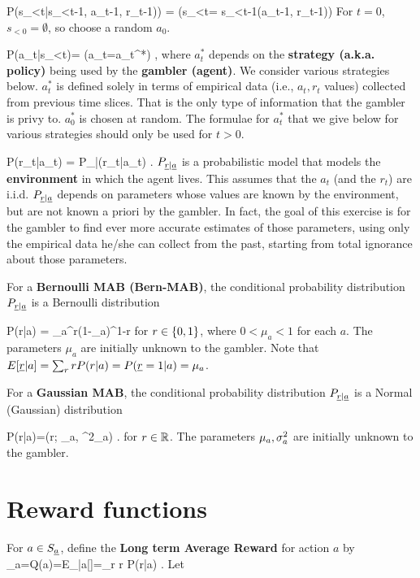 \beq\color{blue}
P(s_{<t}|s_{<t-1}, a_{t-1}, r_{t-1})) = 
\indi(s_{<t}= s_{<t-1}\cup (a_{t-1}, r_{t-1}))
\eeq
For $t=0$, $s_{<0}=\emptyset$, so
 choose a random $a_0$.

\beq\color{blue}
P(a_t|s_{<t})= \indi(a_t=a_t^*)
\;\;
\;,
\eeq
where $a^*_t$ depends on the
 {\bf strategy (a.k.a. policy)} being used
by the {\bf gambler (agent)}.
We consider various
strategies below.
$a^*_t$ is defined
solely in terms
of empirical data
(i.e., $a_t, r_t$
values)
collected from previous 
time slices.
That is the only  type of
information that
the gambler 
is privy to.
$a_0^*$ is chosen at random.
The formulae for $a_t^*$
that we give below 
for various strategies
should only be used for $t>0$.

\beq\color{blue}
P(r_t|a_t) =
P_{\rvr|\rva}(r_t|a_t)
\;\;
\;.
\eeq
$P_{{\underline{r}}|{\underline{a}}}$
is 
a probabilistic model that
models the {\bf environment}
in which the agent lives.
This 
assumes that the $a_t$ (and the $r_t$)
are i.i.d.
$P_{{\underline{r}}|{\underline{a}}}$ 
depends on parameters
whose values are known
by the environment, 
but 
are not known
a priori
by the gambler.
In fact, the goal
of this exercise is for
the gambler to
 find 
ever more accurate 
estimates of those parameters,
using only the empirical 
data he/she can collect
from the past,
starting from total
ignorance about those parameters.


For a {\bf Bernoulli MAB (Bern-MAB)}, the 
conditional probability 
distribution $P_{{\underline{r}}|{\underline{a}}}$
is
a Bernoulli distribution 

\beq
P(r|a) = \mu_a^r(1-\mu_a)^{1-r}
\eeq
for $r\in \{0,1\}$, where $0<\mu_a<1$ for each $a$.
The parameters $\mu_a$ are initially 
unknown to the gambler.
Note that $E[{\underline{r}}|a]=
\sum_r r P(r|a)=P({\underline{r}}=1|a)=\mu_a$.

For a {\bf Gaussian MAB}, the 
conditional probability 
distribution $P_{{\underline{r}}|{\underline{a}}}$
is
a Normal (Gaussian) distribution

\beq
P(r|a)=\caln(r; \mu_a, \s^2_a)
\;.
\eeq
for $r\in{ \mathbb{R}}$.
The parameters $\mu_a, \sigma^2_a$ are initially 
unknown to the gambler.
 
\section{Reward functions}




For $a\in S_{\underline{a}}$, define the 
{\bf Long term Average Reward} for action $a$ by
\beq
\mu_a=Q(a)=E_{|a}[\rvr]=\sum_r r P(r|a)
\;.
\eeq
Let

